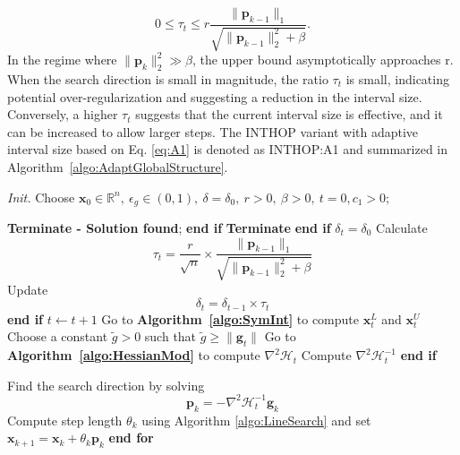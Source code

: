 \documentclass{elsarticle}
\numberwithin{equation}{section}
\begin{document}
\begin{equation}
    0 \leq \tau_t \leq r \frac{\| \mathbf{p}_{k-1} \|_1}{\sqrt{\| \mathbf{p}_{k-1} \|_2^2 + \beta}}.
\end{equation}
\noindent
In the regime where \( \| \mathbf{p}_k \|_2^2 \gg \beta \), the upper bound asymptotically approaches r. When the search direction is small in magnitude, the ratio \( \tau_t \) is small, indicating potential over-regularization and suggesting a reduction in the interval size. Conversely, a higher \( \tau_t \) suggests that the current interval size is effective, and it can be increased to allow larger steps. The INTHOP variant with adaptive interval size based on Eq. \ref{eq:A1} is denoted as INTHOP:A1 and summarized in Algorithm~\ref{algo:AdaptGlobalStructure}.
\begin{algorithm}[H]
\caption{INTHOP:A1}
\textit{Init.} Choose $\mathbf{x}_0 \in \mathbb{R}^n,\ \epsilon_g \in (0, 1),\ \delta = \delta_0,\ r > 0,\ \beta > 0,\ t = 0, c_1>0;$\par
\begin{algorithmic}
        \State \textbf{Terminate - Solution found};
        \vspace{0.3em}
    \EndIf \textbf{end if}
        \State \textbf{Terminate}
        \vspace{0.3em}
    \EndIf \textbf{end if}
            \State $\delta_t = \delta_0$
        \Else
            \State  Calculate
                \begin{equation} 
                    \tau_t = \frac{r}{\sqrt{n}} \times \frac{\| \mathbf{p}_{k-1} \|_1}{\sqrt{\| \mathbf{p}_{k-1} \|_2^2 + \beta}}
                \end{equation}
                Update
                \begin{equation}
                    \delta_t = \delta_{t-1}\times \tau_t
                \end{equation}
        \EndIf \textbf{end if}
        \State $t \xleftarrow{} t + 1$
        \State Go to \textbf{Algorithm~\ref{algo:SymInt}} to compute $\mathbf{x}^L_t$ and $\mathbf{x}^U_t$
        \State Choose  a constant $\tilde g >0$ such that $\tilde g \geq \lVert \textbf{g}_{t}\rVert$
        \State Go to \textbf{Algorithm~\ref{algo:HessianMod}} to compute $\nabla^2 \mathcal{H}_t$
        \State Compute $\nabla^2 \mathcal{H}_t^{-1}$
    \vspace{0.5em}
    \EndIf \textbf{end if}
    
    \State Find the search direction by solving
    \begin{equation}
        \mathbf{p}_k = - \nabla^2 \mathcal{H}_t^{-1}\mathbf{g}_k
    \end{equation}
    \State Compute step length $\theta_k$ using Algorithm \ref{algo:LineSearch} and set $\mathbf{x}_{k+1} = \mathbf{x}_k + \theta_k \mathbf{p}_k$
    \vspace{0.5em}
\EndFor \textbf{end for}
\end{algorithmic}
\label{algo:AdaptGlobalStructure}
\end{algorithm}
\end{document}
